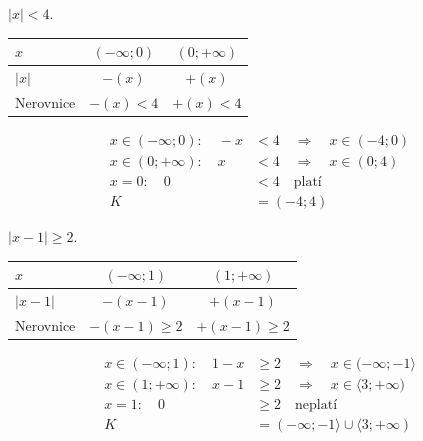 \documentclass[11pt,a4paper]{article}
\begin{document}
\begin{zadaniReseniBox}[title={Samostatná práce 1}]
$|x|<4$.
\tcblower
\begin{center}
\begingroup\footnotesize
\renewcommand{\arraystretch}{1.32}
\begin{tabular}{@{}lcc@{}}
\toprule
$x$ & $(-\infty;0)$ & $(0;+\infty)$ \\
\midrule
$|x|$ & $-(x)$ & $+(x)$ \\
\midrule
Nerovnice & $-(x)<4$ & $+(x)<4$ \\
\bottomrule
\end{tabular}
\endgroup
\end{center}
\[\begin{aligned}x\in (-\infty;0):\quad - x &< 4\quad\Longrightarrow\quad x\in(-4;0)\\[2pt]
x\in (0;+\infty):\quad x &< 4\quad\Longrightarrow\quad x\in(0;4)\\[2pt]
x=0:\quad 0 &< 4\quad\text{platí}\\[2pt]
K&=(-4;4)\end{aligned}\]
\end{zadaniReseniBox}
\begin{zadaniReseniBox}[title={Samostatná práce 2}]
$|x-1|\ge2$.
\tcblower
\begin{center}
\begingroup\footnotesize
\renewcommand{\arraystretch}{1.32}
\begin{tabular}{@{}lcc@{}}
\toprule
$x$ & $(-\infty;1)$ & $(1;+\infty)$ \\
\midrule
$|x - 1|$ & $-(x - 1)$ & $+(x - 1)$ \\
\midrule
Nerovnice & $-(x - 1)\ge2$ & $+(x - 1)\ge2$ \\
\bottomrule
\end{tabular}
\endgroup
\end{center}
\[\begin{aligned}x\in (-\infty;1):\quad 1 - x &\ge 2\quad\Longrightarrow\quad x\in(-\infty;-1\rangle\\[2pt]
x\in (1;+\infty):\quad x - 1 &\ge 2\quad\Longrightarrow\quad x\in\langle3;+\infty)\\[2pt]
x=1:\quad 0 &\ge 2\quad\text{neplatí}\\[2pt]
K&=(-\infty;-1\rangle\cup\langle3;+\infty)\end{aligned}\]
\end{zadaniReseniBox}
\end{document}
